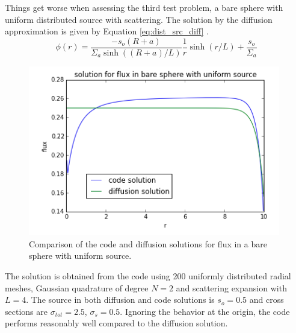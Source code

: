 \documentclass[11pt, oneside]{article}   	%
\begin{document}
Things get worse when assessing the third test problem, a bare sphere with uniform distributed source with scattering. The solution by the diffusion approximation is given by Equation \ref{eq:dist_src_diff} \cite{lewis_fundamentals}.
%
\begin{equation}\label{eq:dist_src_diff}
\phi(r) = \frac{-s_o(R+a)}{\Sigma_a \sinh((R+a)/L)}\frac{1}{r}\sinh(r/L)+\frac{s_o}{\Sigma_a}
\end{equation}
%
\begin{figure}
\centering
\includegraphics[width=11cm]{uniform_src}
\caption{Comparison of the code and diffusion solutions for flux in a bare sphere with uniform source.}
\label{fig:uniform_src_comp}
\end{figure}
%
The solution is obtained from the code using 200 uniformly distributed radial meshes, Gaussian quadrature of degree $N=2$ and scattering expansion with $L=4$. The source in both diffusion and code solutions is $s_o=0.5$ and cross sections are $\sigma_{tot} = 2.5$, $\sigma_s = 0.5$. Ignoring the behavior at the origin, the code performs reasonably well compared to the diffusion solution. 
\end{document}
